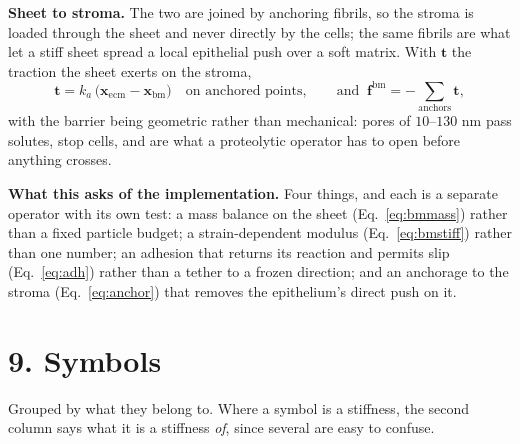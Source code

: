\documentclass[10pt,a4paper]{article}
\begin{document}
\textbf{Sheet to stroma.} The two are joined by anchoring fibrils, so the stroma is loaded through the
sheet and never directly by the cells; the same fibrils are what let a stiff sheet spread a local
epithelial push over a soft matrix. With $\mathbf t$ the traction the sheet exerts on the stroma,
%
\begin{equation}
\mathbf t = k_a\,\bigl(\mathbf x_{\text{ecm}}-\mathbf x_{\text{bm}}\bigr)\quad\text{on anchored
points},\qquad
\text{and }\ \mathbf f^{\text{bm}} = -\!\!\sum_{\text{anchors}}\!\mathbf t ,
\label{eq:anchor}
\end{equation}
%
with the barrier being geometric rather than mechanical: pores of $10$--$130$ nm pass solutes, stop
cells, and are what a proteolytic operator has to open before anything crosses.

\textbf{What this asks of the implementation.} Four things, and each is a separate operator with its
own test: a mass balance on the sheet (Eq.~\ref{eq:bmmass}) rather than a fixed particle budget; a
strain-dependent modulus (Eq.~\ref{eq:bmstiff}) rather than one number; an adhesion that returns its
reaction and permits slip (Eq.~\ref{eq:adh}) rather than a tether to a frozen direction; and an
anchorage to the stroma (Eq.~\ref{eq:anchor}) that removes the epithelium's direct push on it.

\section*{9.\; Symbols}

Grouped by what they belong to. Where a symbol is a stiffness, the second column says what it is a
stiffness \emph{of}, since several are easy to confuse.
\end{document}

